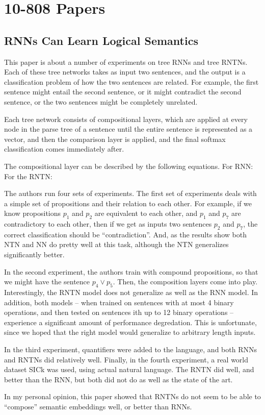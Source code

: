 \documentclass[12pt]{article}
\begin{document}
\section{10-808 Papers}

\subsection{RNNs Can Learn Logical Semantics \cite{RNNSemantics}}

This paper is about a number of experiments on tree RNNs and tree RNTNs. Each of these tree networks takes as input two sentences, and the output is a classification problem of how the two sentences are related. For example, the first sentence might entail the second sentence, or it might contradict the second sentence, or the two sentences might be completely unrelated.

Each tree network consists of compositional layers, which are applied at every node in the parse tree of a sentence until the entire sentence is represented as a vector, and then the comparison layer is applied, and the final softmax classification comes immediately after.

The compositional layer can be described by the following equations. For RNN:
For the RNTN:

The authors run four sets of experiments. The first set of experiments deals with a simple set of propositions and their relation to each other. For example, if we know propositions $p_1$ and $p_2$ are equivalent to each other, and $p_1$ and $p_7$ are contradictory to each other, then if we get as inputs two sentences $p_2$ and $p_7$, the correct classification should be ``contradiction''. And, as the results show both NTN and NN do pretty well at this task, although the NTN generalizes significantly better.

In the second experiment, the authors train with compound propositions, so that we might have the sentence $p_4 \vee p_5$. Then, the composition layers come into play. Interestingly, the RNTN model does not generalize as well as the RNN model. In addition, both models -- when trained on sentences with at most 4 binary operations, and then tested on sentences ith up to 12 binary operations -- experience a significant amount of performance degredation. This is unfortunate, since we hoped that the right model would generalize to arbitrary length inputs.

In the third experiment, quantifiers were added to the language, and both RNNs and RNTNs did relatively well. Finally, in the fourth experiment, a real world dataset SICk was used, using actual natural language. The RNTN did well, and better than the RNN, but both did not do as well as the state of the art.

In my personal opinion, this paper showed that RNTNs do not seem to be able to ``compose'' semantic embeddings well, or better than RNNs. 


\end{document}

